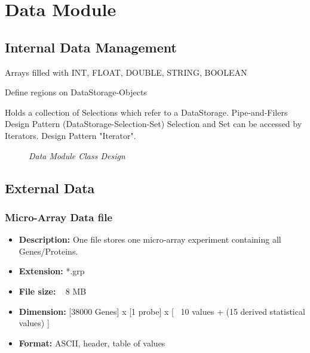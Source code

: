 \section{Data Module}

\subsection{Internal Data Management}

Arrays filled with INT, FLOAT, DOUBLE, STRING, BOOLEAN

Define regions on DataStorage-Objects

Holds a collection of Selections which refer to a DataStorage.
Pipe-and-Filers Design Pattern (DataStorage-Selection-Set)
Selection and Set can be accessed by Iterators. Design Pattern "Iterator".

\begin{figure}[ht]
\centering
{} 
\caption[Data Module Class Design]{\textit{Data Module Class Design}} 
\label{gfx:data_module_class_design}
\end{figure}

\subsection{External Data}

\subsubsection{Micro-Array Data file}

\begin{itemize}
\item \textbf{Description: } One file stores one micro-array experiment containing all Genes/Proteins.
\item \textbf{Extension:}  *.grp
\item \textbf{File size: } ~ 8 MB
\item \textbf{Dimension: } [38000 Genes] x [1 probe] x [ ~10 values + (15 derived statistical values) ]
\item \textbf{Format: } ASCII, header, table of values
\end{itemize}

